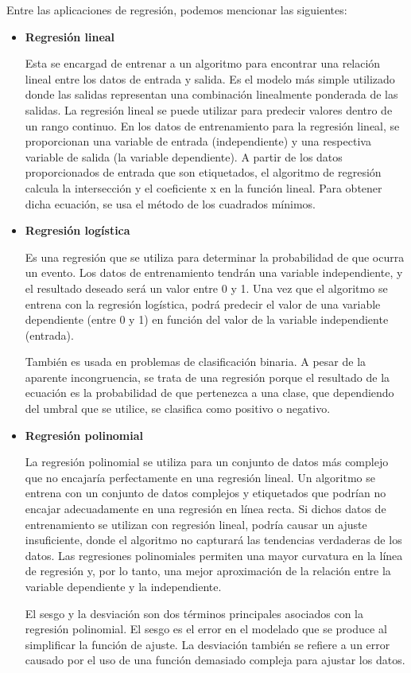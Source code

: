  Entre las aplicaciones de regresión, podemos mencionar las siguientes:
 \begin{itemize}

    \item \textbf{Regresión lineal}\par
   Esta se encargad de entrenar a un algoritmo para encontrar una relación lineal entre los datos de entrada y salida. Es el modelo más simple utilizado donde las salidas representan una combinación linealmente ponderada de las salidas. La regresión lineal se puede utilizar para predecir valores dentro de un rango continuo.  En los datos de entrenamiento para la regresión lineal, se proporcionan una variable de entrada (independiente) y una respectiva variable de salida (la variable dependiente). A partir de los datos proporcionados de entrada que son etiquetados, el algoritmo de regresión calcula la intersección y el coeficiente x en la función lineal. Para obtener dicha ecuación, se usa el método de los cuadrados mínimos.\par
    \item \textbf{Regresión logística}\par
    Es una regresión que se utiliza para determinar la probabilidad de que ocurra un evento. Los datos de entrenamiento tendrán una variable independiente, y el resultado deseado será un valor entre 0 y 1. Una vez que el algoritmo se entrena con la regresión logística, podrá predecir el valor de una variable dependiente (entre 0 y 1) en función del valor de la variable independiente (entrada).\par
    También es usada en problemas de clasificación binaria. A pesar de la aparente incongruencia, se trata de una regresión porque el resultado de la ecuación es la probabilidad de que pertenezca a una clase, que dependiendo del umbral que se utilice, se clasifica como positivo o negativo.
    \item \textbf{Regresión polinomial}\par
    La regresión polinomial se utiliza para un conjunto de datos más complejo que no encajaría perfectamente en una regresión lineal. Un algoritmo se entrena con un conjunto de datos complejos y etiquetados que podrían no encajar adecuadamente en una regresión en línea recta. Si dichos datos de entrenamiento se utilizan con regresión lineal, podría causar un ajuste insuficiente, donde el algoritmo no capturará las tendencias verdaderas de los datos. Las regresiones polinomiales permiten una mayor curvatura en la línea de regresión y, por lo tanto, una mejor aproximación de la relación entre la variable dependiente y la independiente.\par
    El sesgo y la desviación son dos términos principales asociados con la regresión polinomial. El sesgo es el error en el modelado que se produce al simplificar la función de ajuste. La desviación también se refiere a un error causado por el uso de una función demasiado compleja para ajustar los datos.\par
    
    
\end{itemize}
 
